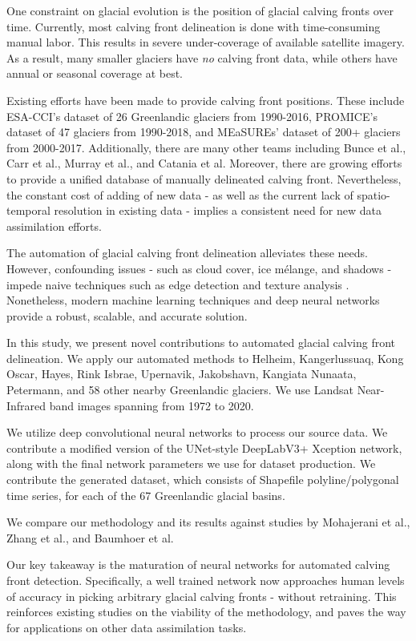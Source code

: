 \documentclass[tc, manuscript]{copernicus}
\begin{document}
One constraint on glacial evolution is the position of glacial calving fronts over time. Currently, most calving front delineation is done with time-consuming manual labor. This results in severe under-coverage of available satellite imagery. As a result, many smaller glaciers have {\em no} calving front data, while others have annual or seasonal coverage at best.

Existing efforts have been made to provide calving front positions. These include ESA-CCI's dataset of 26 Greenlandic glaciers from 1990-2016, PROMICE's dataset of 47 glaciers from 1990-2018, and MEaSUREs' dataset of 200+ glaciers from 2000-2017\citep{enveo2017,andersen2019,Joughin2015}. Additionally, there are many other teams including Bunce et al., Carr et al., Murray et al., and Catania et al. Moreover, there are growing efforts to provide a unified database of manually delineated calving front. Nevertheless, the constant cost of adding of new data - as well as the current lack of spatio-temporal resolution in existing data - implies a consistent need for new data assimilation efforts.

The automation of glacial calving front delineation alleviates these needs. However, confounding issues - such as cloud cover, ice mélange, and shadows - impede naive techniques such as edge detection \citep{paravolidakis2016} and texture analysis \citep{malik2001}. Nonetheless, modern machine learning techniques and deep neural networks provide a robust, scalable, and accurate solution.

In this study, we present novel contributions to automated glacial calving front delineation. We apply our automated methods to Helheim, Kangerlussuaq, Kong Oscar, Hayes, Rink Isbrae, Upernavik, Jakobshavn, Kangiata Nunaata, Petermann, and 58 other nearby Greenlandic glaciers. We use Landsat Near-Infrared band images spanning from 1972 to 2020.

We utilize deep convolutional neural networks to process our source data. We contribute a modified version of the UNet-style DeepLabV3+ Xception network, along with the final network parameters we use for dataset production. We contribute the generated dataset, which consists of Shapefile polyline/polygonal time series, for each of the 67 Greenlandic glacial basins.

We compare our methodology and its results against studies by Mohajerani et al., Zhang et al., and Baumhoer et al.

Our key takeaway is the maturation of neural networks for automated calving front detection. Specifically, a well trained network now approaches human levels of accuracy in picking arbitrary glacial calving fronts - without retraining. This reinforces existing studies on the viability of the methodology, and paves the way for applications on other data assimilation tasks.
\end{document}

